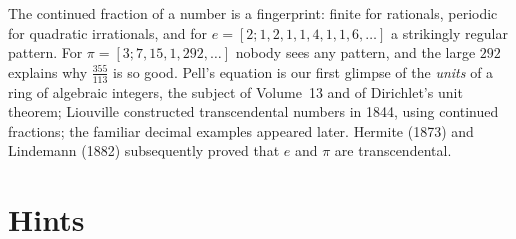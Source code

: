 \begin{beauty}
The continued fraction of a number is a fingerprint: finite for rationals, periodic for quadratic irrationals, and for $e=[2;1,2,1,1,4,1,1,6,\dots]$ a strikingly regular pattern. For $\pi=[3;7,15,1,292,\dots]$ nobody sees any pattern, and the large $292$ explains why $\frac{355}{113}$ is so good. Pell's equation is our first glimpse of the \emph{units} of a ring of algebraic integers, the subject of Volume~13 and of Dirichlet's unit theorem; Liouville constructed transcendental numbers in 1844, using continued fractions; the familiar decimal examples appeared later. Hermite (1873) and Lindemann (1882) subsequently proved that $e$ and $\pi$ are transcendental.
\end{beauty}

\section{Hints}

